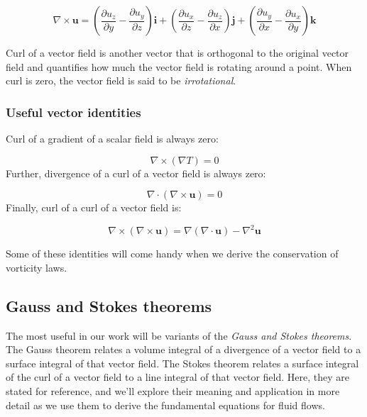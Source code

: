\documentclass[12pt]{article}
\numberwithin{equation}{section}
\numberwithin{figure}{section}
\numberwithin{table}{section}
\begin{document}
\begin{equation}
  \nabla \times \mathbf{u} = \left( \frac{\partial u_z}{\partial y} -
    \frac{\partial u_y}{\partial z} \right) \mathbf{i} +
    \left( \frac{\partial u_x}{\partial z} -
    \frac{\partial u_z}{\partial x} \right) \mathbf{j} +
    \left( \frac{\partial u_y}{\partial x} -
    \frac{\partial u_x}{\partial y} \right) \mathbf{k}
\end{equation}

Curl of a vector field is another vector that is orthogonal to the original
vector field and quantifies how much the vector field is rotating around a
point.
When curl is zero, the vector field is said to be \textit{irrotational}.

\subsubsection{Useful vector identities}

Curl of a gradient of a scalar field is always zero:

\begin{equation}
  \nabla \times (\nabla T) = 0
\end{equation}
Further, divergence of a curl of a vector field is always zero:

\begin{equation}
  \nabla \cdot (\nabla \times \mathbf{u}) = 0
\end{equation}
Finally, curl of a curl of a vector field is:

\begin{equation}
  \nabla \times (\nabla \times \mathbf{u}) = \nabla (\nabla \cdot \mathbf{u}) - \nabla^2 \mathbf{u}
\end{equation}

Some of these identities will come handy when we derive the conservation of
vorticity laws.

\subsection{Gauss and Stokes theorems}

The most useful in our work will be variants of the
\textit{Gauss and Stokes theorems}.
The Gauss theorem relates a volume integral of a divergence of a vector field
to a surface integral of that vector field.
The Stokes theorem relates a surface integral of the curl of a vector field to
a line integral of that vector field.
Here, they are stated for reference, and we'll explore their meaning and
application in more detail as we use them to derive the fundamental equations
for fluid flows.
\end{document}
